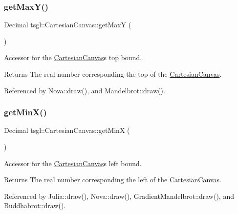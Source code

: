 \subsubsection{\texorpdfstring{get\+Max\+Y()}{getMaxY()}}
{\footnotesize\ttfamily Decimal tsgl\+::\+Cartesian\+Canvas\+::get\+MaxY (\begin{DoxyParamCaption}{ }\end{DoxyParamCaption})\hspace{0.3cm}{\ttfamily [inline]}}



Accessor for the \hyperlink{classtsgl_1_1_cartesian_canvas}{Cartesian\+Canvas}\textquotesingle{}s top bound. 

\begin{DoxyReturn}{Returns}
The real number corresponding the top of the \hyperlink{classtsgl_1_1_cartesian_canvas}{Cartesian\+Canvas}. 
\end{DoxyReturn}


Referenced by Nova\+::draw(), and Mandelbrot\+::draw().

\mbox{\label{classtsgl_1_1_cartesian_canvas_a4ab031c60f6fed675e8163c30c01e5d6}} 
\subsubsection{\texorpdfstring{get\+Min\+X()}{getMinX()}}
{\footnotesize\ttfamily Decimal tsgl\+::\+Cartesian\+Canvas\+::get\+MinX (\begin{DoxyParamCaption}{ }\end{DoxyParamCaption})\hspace{0.3cm}{\ttfamily [inline]}}



Accessor for the \hyperlink{classtsgl_1_1_cartesian_canvas}{Cartesian\+Canvas}\textquotesingle{}s left bound. 

\begin{DoxyReturn}{Returns}
The real number corresponding the left of the \hyperlink{classtsgl_1_1_cartesian_canvas}{Cartesian\+Canvas}. 
\end{DoxyReturn}


Referenced by Julia\+::draw(), Nova\+::draw(), Gradient\+Mandelbrot\+::draw(), and Buddhabrot\+::draw().

\mbox{\label{classtsgl_1_1_cartesian_canvas_a99c935c99c9a29f2cc918963d734d9a6}} 
